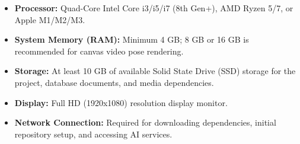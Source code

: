 \begin{itemize}
    \item \textbf{Processor:} Quad-Core Intel Core i3/i5/i7 (8th Gen+), AMD Ryzen 5/7, or Apple M1/M2/M3.
    \item \textbf{System Memory (RAM):} Minimum 4 GB; 8 GB or 16 GB is recommended for canvas video pose rendering.
    \item \textbf{Storage:} At least 10 GB of available Solid State Drive (SSD) storage for the project, database documents, and media dependencies.
    \item \textbf{Display:} Full HD (1920x1080) resolution display monitor.
    \item \textbf{Network Connection:} Required for downloading dependencies, initial repository setup, and accessing AI services.
\end{itemize}
